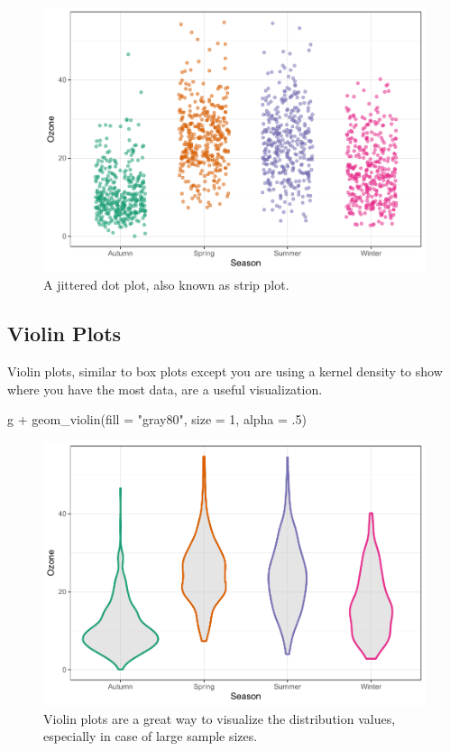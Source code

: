 \documentclass[
]{krantz}
\makeatletter
\newenvironment{Shaded}{\begin{snugshade}}{\end{snugshade}}
\newcommand{\AttributeTok}[1]{\textcolor[rgb]{0.61,0.61,0.61}{#1}}
\newcommand{\DecValTok}[1]{\textcolor[rgb]{0.06,0.06,0.06}{#1}}
\newcommand{\FunctionTok}[1]{\textcolor[rgb]{0,0,0}{#1}}
\newcommand{\NormalTok}[1]{#1}
\newcommand{\SpecialCharTok}[1]{\textcolor[rgb]{0,0,0}{#1}}
\newcommand{\StringTok}[1]{\textcolor[rgb]{0.5,0.5,0.5}{#1}}
\newenvironment{kframe}{%
\medskip{}
\setlength{\fboxsep}{.8em}
 \def\at@end@of@kframe{}%
 \ifinner\ifhmode%
  \def\at@end@of@kframe{\end{minipage}}%
  \begin{minipage}{\columnwidth}%
 \fi\fi%
 \def\FrameCommand##1{\hskip\@totalleftmargin \hskip-\fboxsep
 \colorbox{shadecolor}{##1}\hskip-\fboxsep
     \hskip-\linewidth \hskip-\@totalleftmargin \hskip\columnwidth}%
 \MakeFramed {\advance\hsize-\width
   \@totalleftmargin\z@ \linewidth\hsize
   \@setminipage}}%
 {\par\unskip\endMakeFramed%
 \at@end@of@kframe}
\renewenvironment{Shaded}{\begin{kframe}}{\end{kframe}}
\makeatother
\begin{document}
\begin{figure}
\centering
\includegraphics{bookdown_files/figure-latex/jitter-1.pdf}
\caption{\label{fig:jitter}A jittered dot plot, also known as strip plot.}
\end{figure}

\hypertarget{violin-plots}{%
\subsection{Violin Plots}\label{violin-plots}}

Violin plots, similar to box plots except you are using a kernel density to show where you have the most data, are a useful visualization.

\begin{Shaded}
\begin{Highlighting}[]
\NormalTok{g }\SpecialCharTok{+} \FunctionTok{geom\_violin}\NormalTok{(}\AttributeTok{fill =} \StringTok{"gray80"}\NormalTok{, }\AttributeTok{size =} \DecValTok{1}\NormalTok{, }\AttributeTok{alpha =}\NormalTok{ .}\DecValTok{5}\NormalTok{)}
\end{Highlighting}
\end{Shaded}

\begin{figure}
\centering
\includegraphics{bookdown_files/figure-latex/violin-1.pdf}
\caption{\label{fig:violin}Violin plots are a great way to visualize the distribution values, especially in case of large sample sizes.}
\end{figure}
\end{document}
